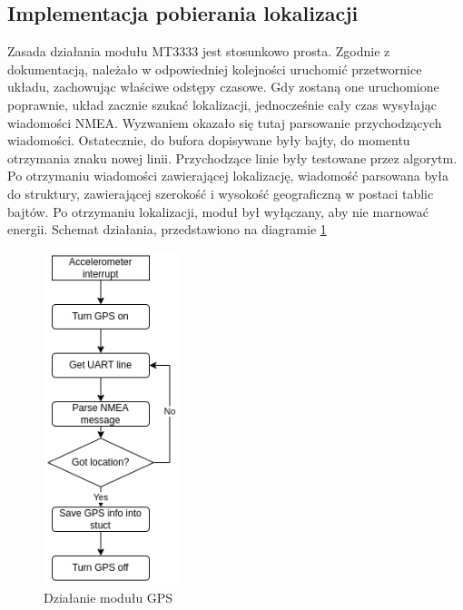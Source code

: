 \subsection{Implementacja pobierania lokalizacji}
Zasada działania modułu MT3333 jest stosunkowo prosta. Zgodnie z dokumentacją\cite{MT3333}, należało w odpowiedniej kolejności uruchomić przetwornice układu, zachowując właściwe odstępy czasowe. Gdy zostaną one uruchomione poprawnie, układ zacznie szukać lokalizacji, jednocześnie cały czas wysyłając wiadomości NMEA. Wyzwaniem okazało się tutaj parsowanie przychodzących wiadomości. Ostatecznie, do bufora dopisywane były bajty, do momentu otrzymania znaku nowej linii. Przychodzące linie były testowane przez algorytm. Po otrzymaniu wiadomości zawierającej lokalizację, wiadomość parsowana była do struktury, zawierającej szerokość i wysokość geograficzną w postaci tablic bajtów. Po otrzymaniu lokalizacji, moduł był wyłączany, aby nie marnować energii. Schemat działania, przedstawiono na diagramie \ref{img:gps_diagram}
\begin{figure}[h]
    \centering
    \includegraphics[width=4cm]{Graphics/GPS_NMEA.png}
    \caption{Działanie modułu GPS}
    \label{img:gps_diagram}
\end{figure}

